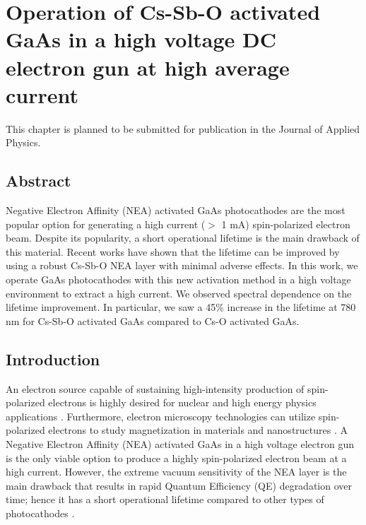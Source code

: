 \chapter{Operation of Cs-Sb-O activated GaAs in a high voltage DC electron gun at high average current}

This chapter is planned to be submitted for publication in the Journal of Applied Physics.

\section{Abstract}
Negative Electron Affinity (NEA) activated GaAs photocathodes are the most popular option for generating a high current ($>$ 1 mA) spin-polarized electron beam. Despite its popularity, a short operational lifetime is the main drawback of this material. Recent works have shown that the lifetime can be improved by using a robust Cs-Sb-O NEA layer with minimal adverse effects. In this work, we operate GaAs photocathodes with this new activation method in a high voltage environment to extract a high current.
We observed spectral dependence on the lifetime improvement.
In particular, we saw a 45\% increase in the lifetime at 780 nm for Cs-Sb-O activated GaAs compared to Cs-O activated GaAs.

\section{Introduction}

An electron source capable of sustaining high-intensity production of spin-polarized electrons is highly desired for nuclear and high energy physics applications \cite{cardman2018,adolphson2011large}.
Furthermore, electron microscopy technologies can utilize spin-polarized electrons to study magnetization in materials and nanostructures \cite{suzuki2010_RealTimeMagnetic,kuwahara2012_30kVSpinpolarizedTransmission,vollmer2003}.
A Negative Electron Affinity (NEA) activated GaAs in a high voltage electron gun is the only viable option to produce a highly spin-polarized electron beam at a high current.
However, the extreme vacuum sensitivity of the NEA layer is the main drawback that results in rapid Quantum Efficiency (QE) degradation over time; hence it has a short operational lifetime compared to other types of photocathodes \cite{grames2011_ChargeFluenceLifetime, bae2018_RuggedSpinpolarizedElectron,bae2020_ImprovedLifetimeHigh,cultrera2020_LongLifetimePolarized}.

